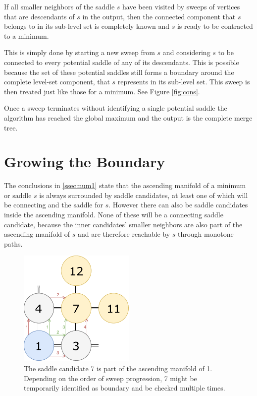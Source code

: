 \documentclass[%
	paper=A4,					%
	twoside=true,				%
	openright,					%
	parskip=full,				%
	chapterprefix=true,			%
	11pt,						%
	headings=normal,			%
	bibliography=totoc,			%
	listof=totoc,				%
	titlepage=on,				%
	captions=tableabove,		%
	draft=false,				%
]{scrreprt}%
\begin{document}
If all smaller neighbors of the saddle \(s\) have been visited by sweeps of vertices that are descendants of \(s\) in the output, then the connected component that \(s\) belongs to in its sub-level set is completely known and \(s\) is ready to be contracted to a minimum. 

This is simply done by starting a new sweep from \(s\) and considering \(s\) to be connected to every potential saddle of any of its descendants. This is possible because the set of these potential saddles still forms a boundary around the complete level-set component, that \(s\) represents in its sub-level set. This sweep is then treated just like those for a minimum. See Figure \ref{fig:cons}.

Once a sweep terminates without identifying a single potential saddle the algorithm has reached the global maximum and the output is the complete merge tree.
 
\section{Growing the Boundary}
The conclusions in \ref{ssec:num1} state that the ascending manifold of a minimum or saddle \(s\) is always surrounded by saddle candidates, at least one of which will be connecting and the saddle for \(s\). However there can also be saddle candidates inside the ascending manifold. None of these will be a connecting saddle candidate, because the inner candidates' smaller neighbors are also part of the ascending manifold of \(s\) and are therefore reachable by \(s\) through monotone paths. 

\begin{figure}[h!]
\centering
\includegraphics[width=0.5\textwidth]{figures/MultiVisit.pdf}
\caption{The saddle candidate 7 is part of the ascending manifold of 1. Depending on the order of sweep progression, 7 might be temporarily identified as boundary and be checked multiple times.}
\label{fig:mv}
\end{figure}
\end{document}
